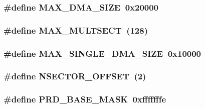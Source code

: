 \label{ide__disk_8hh_a3c15c23524c451211d9eb469b602bb80}
\hypertarget{ide__disk_8hh_a941d6074126345e6acdf3d91ee305b11}{
\subsubsection[{MAX\_\-DMA\_\-SIZE}]{\setlength{\rightskip}{0pt plus 5cm}\#define MAX\_\-DMA\_\-SIZE~0x20000}}
\label{ide__disk_8hh_a941d6074126345e6acdf3d91ee305b11}
\hypertarget{ide__disk_8hh_a78590681c8717cc04539b5c406dda023}{
\subsubsection[{MAX\_\-MULTSECT}]{\setlength{\rightskip}{0pt plus 5cm}\#define MAX\_\-MULTSECT~(128)}}
\label{ide__disk_8hh_a78590681c8717cc04539b5c406dda023}
\hypertarget{ide__disk_8hh_ad950b58f27507f6e618a3ef8352ae796}{
\subsubsection[{MAX\_\-SINGLE\_\-DMA\_\-SIZE}]{\setlength{\rightskip}{0pt plus 5cm}\#define MAX\_\-SINGLE\_\-DMA\_\-SIZE~0x10000}}
\label{ide__disk_8hh_ad950b58f27507f6e618a3ef8352ae796}
\hypertarget{ide__disk_8hh_a3c028923d4dbc280c75f2d05a07af561}{
\subsubsection[{NSECTOR\_\-OFFSET}]{\setlength{\rightskip}{0pt plus 5cm}\#define NSECTOR\_\-OFFSET~(2)}}
\label{ide__disk_8hh_a3c028923d4dbc280c75f2d05a07af561}
\hypertarget{ide__disk_8hh_a0bcee6e9fd01e441176bd95db85fb66f}{
\subsubsection[{PRD\_\-BASE\_\-MASK}]{\setlength{\rightskip}{0pt plus 5cm}\#define PRD\_\-BASE\_\-MASK~0xfffffffe}}
